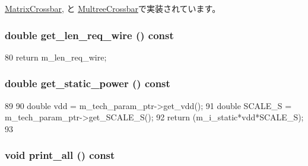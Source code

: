 \hyperlink{classMatrixCrossbar_a912bfef03e3ce71b4bbc0b5136b087f5}{MatrixCrossbar}, と \hyperlink{classMultreeCrossbar_a912bfef03e3ce71b4bbc0b5136b087f5}{MultreeCrossbar}で実装されています。\hypertarget{classCrossbar_a4081e0c25d75c90fcce79f1ccf1754ee}{
\subsubsection[{get\_\-len\_\-req\_\-wire}]{\setlength{\rightskip}{0pt plus 5cm}double get\_\-len\_\-req\_\-wire () const}}
\label{classCrossbar_a4081e0c25d75c90fcce79f1ccf1754ee}



\begin{DoxyCode}
80 { return m_len_req_wire; }
\end{DoxyCode}
\hypertarget{classCrossbar_aeb5933543cfdeb1668baed5ce7c68351}{
\subsubsection[{get\_\-static\_\-power}]{\setlength{\rightskip}{0pt plus 5cm}double get\_\-static\_\-power () const}}
\label{classCrossbar_aeb5933543cfdeb1668baed5ce7c68351}



\begin{DoxyCode}
89 {
90     double vdd = m_tech_param_ptr->get_vdd();
91     double SCALE_S = m_tech_param_ptr->get_SCALE_S();
92     return (m_i_static*vdd*SCALE_S);
93 }
\end{DoxyCode}
\hypertarget{classCrossbar_a8404831790e4809674f0249ef6505cd5}{
\subsubsection[{print\_\-all}]{\setlength{\rightskip}{0pt plus 5cm}void print\_\-all () const}}
\label{classCrossbar_a8404831790e4809674f0249ef6505cd5}




